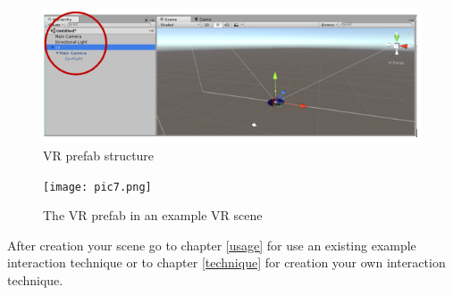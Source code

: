 \documentclass[../../Instructions_Framework]{subfiles}
\begin{document}
\begin{figure}
	\centering
	\includegraphics[width=0.7\linewidth]{img/screenshot005}
	\caption{VR prefab structure}
	\label{fig:screenshot005}
\end{figure}

\begin{figure}[htp]
	\centering
	\texttt{[image: pic7.png]}
	\caption{The VR prefab in an example VR scene}
	\label{pic8}
\end{figure}
After creation your scene go to chapter \ref{usage} for use an existing example interaction technique or to chapter \ref{technique} for creation your own interaction technique.
\end{document}
